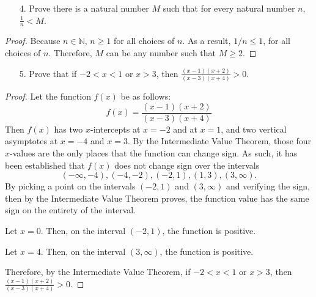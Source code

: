 \documentclass[10pt]{article}
\theoremstyle{definition}
\theoremstyle{plain}
\newcommand{\N}{\mathbb{N}}
\begin{document}
\begin{enumerate}
  \item[4.] Prove there is a natural number $M$ such that for every natural number $n$, $\frac{1}{n} < M$.
\end{enumerate}

\setcounter{equation}{0}
\begin{proof}
  Because $n\in\N$, $n\geq 1$ for all choices of $n$. As a result, $1/n \leq 1$, for all choices of $n$. Therefore, $M$ can be any number such that $M\geq 2$.
\end{proof}



\pagebreak



\begin{enumerate}
  \item[5.] Prove that if $-2 < x < 1$ or $x > 3$, then $\frac{(x-1)(x+2)}{(x-3)(x+4)} > 0$.
\end{enumerate}

\setcounter{equation}{0}
\begin{proof}
  Let the function $f(x)$ be as follows:
  \begin{equation}
    f(x) = \frac{(x-1)(x+2)}{(x-3)(x+4)}
  \end{equation}
Then $f(x)$ has two $x$-intercepts at $x=-2$ and at $x=1$, and two vertical asymptotes at $x=-4$ and $x=3$. By the Intermediate Value Theorem, those four $x$-values are the only places that the function can change sign. As such, it has been established that $f(x)$ does not change sign over the intervals 
$$
(-\infty,-4), (-4,-2), (-2,1), (1,3), (3,\infty).
$$
By picking a point on the intervals $(-2,1)$ and $(3,\infty)$ and verifying the sign, then by the Intermediate Value Theorem proves, the function value has the same sign on the entirety of the interval.

Let $x=0$. Then, on the interval $(-2,1)$, the function is positive.

Let $x=4$. Then, on the interval $(3,\infty)$, the function is positive.

Therefore, by the Intermediate Value Theorem, if $-2 < x < 1$ or $x > 3$, then $\frac{(x-1)(x+2)}{(x-3)(x+4)} > 0$.
\end{proof}
\end{document}
